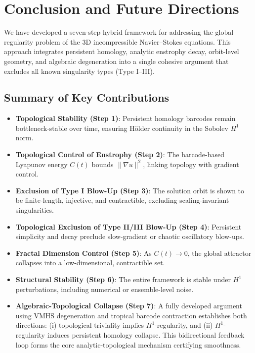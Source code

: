 \documentclass[11pt]{article}
\theoremstyle{definition}
\begin{document}
\section{Conclusion and Future Directions}

We have developed a seven-step hybrid framework for addressing the global regularity problem of the 3D incompressible Navier--Stokes equations. This approach integrates persistent homology, analytic enstrophy decay, orbit-level geometry, and algebraic degeneration into a single cohesive argument that excludes all known singularity types (Type I--III).

\subsection*{Summary of Key Contributions}

\begin{itemize}
    \item \textbf{Topological Stability (Step 1)}: Persistent homology barcodes remain bottleneck-stable over time, ensuring H\"older continuity in the Sobolev $H^1$ norm.
    \item \textbf{Topological Control of Enstrophy (Step 2)}: The barcode-based Lyapunov energy $C(t)$ bounds $\|\nabla u\|^2$, linking topology with gradient control.
    \item \textbf{Exclusion of Type I Blow-Up (Step 3)}: The solution orbit is shown to be finite-length, injective, and contractible, excluding scaling-invariant singularities.
    \item \textbf{Topological Exclusion of Type II/III Blow-Up (Step 4)}: Persistent simplicity and decay preclude slow-gradient or chaotic oscillatory blow-ups.
    \item \textbf{Fractal Dimension Control (Step 5)}: As $C(t) \to 0$, the global attractor collapses into a low-dimensional, contractible set.
    \item \textbf{Structural Stability (Step 6)}: The entire framework is stable under $H^1$ perturbations, including numerical or ensemble-level noise.
    \item \textbf{Algebraic-Topological Collapse (Step 7)}: A fully developed argument using VMHS degeneration and tropical barcode contraction establishes both directions: (i) topological triviality implies $H^1$-regularity, and (ii) $H^1$-regularity induces persistent homology collapse. This bidirectional feedback loop forms the core analytic-topological mechanism certifying smoothness.
\end{itemize}
\end{document}
